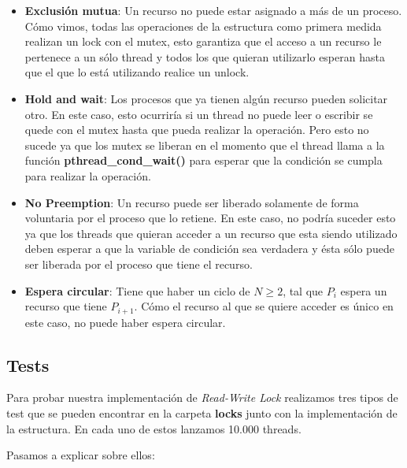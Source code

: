 \begin{itemize}
	\item \textbf{Exclusión mutua}: Un recurso no puede estar asignado a más de un proceso. 
\newline
	Cómo vimos, todas las operaciones de la estructura como primera medida realizan un lock con el mutex, esto garantiza que el acceso a un recurso le pertenece a un sólo thread y todos los que quieran utilizarlo esperan hasta que el que lo está utilizando realice un unlock.

	\item \textbf{Hold and wait}: Los procesos que ya tienen algún recurso pueden solicitar otro.
\newline
	En este caso, esto ocurriría si un thread no puede leer o escribir se quede con el mutex hasta que pueda realizar la operación. Pero esto no sucede ya que los mutex se liberan en el momento que el thread llama a la función \textbf{pthread\_cond\_wait()} para esperar que la condición se cumpla para realizar la operación.
	
	\item \textbf{No Preemption}: Un recurso puede ser liberado solamente de forma voluntaria por el proceso que lo retiene.
\newline
	En este caso, no podría suceder esto ya que los threads que quieran acceder a un recurso que esta siendo utilizado deben esperar a que la variable de condición sea verdadera y ésta sólo puede ser liberada por el proceso que tiene el recurso.
	
	\item \textbf{Espera circular}: Tiene que haber un ciclo de $N \geq 2$, tal que $P_i$ espera un recurso que tiene $P_{i+1}$.
\newline
	Cómo el recurso al que se quiere acceder es único en este caso, no puede haber espera circular.
\end{itemize}


\subsection{Tests}

Para probar nuestra implementación de \textit{Read-Write Lock} realizamos tres tipos de test que se pueden encontrar en la carpeta \textbf{locks} junto con la implementación de la estructura. En cada uno de estos lanzamos 10.000 threads.

Pasamos a explicar sobre ellos:

